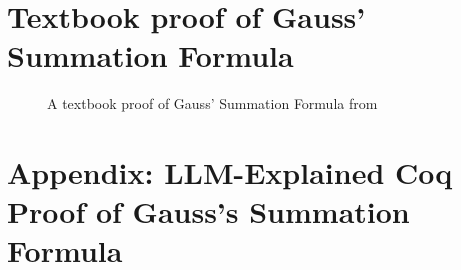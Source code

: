 \documentclass[10pt,nonacm,natbib=false]{acmart}
\begin{document}
\appendix

\newpage
\section{Textbook proof of Gauss' Summation Formula}
\label{sec:textbookproof}

\begin{figure}[h]
  \caption{A textbook proof of Gauss' Summation Formula from \cite{roberts2014introduction}}
\end{figure}
  
\newpage
\section{Appendix: LLM-Explained Coq Proof of Gauss's Summation Formula}
\label{sec:explained}
\end{document}
